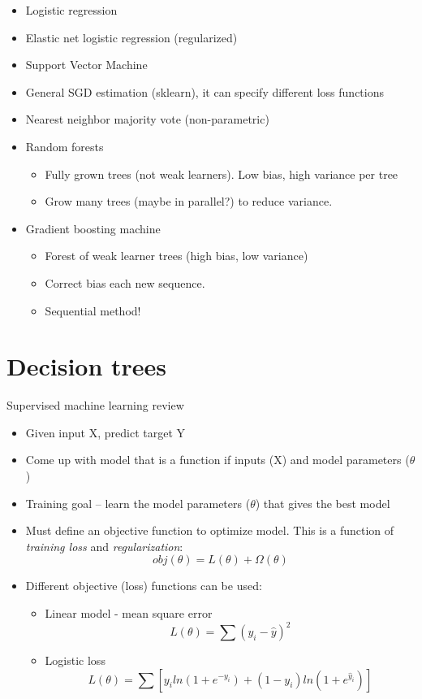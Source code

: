 \documentclass[fontset=fandol,zihao=false,scheme=chinese,heading=true,UTF8]{ctexbook}
\providecommand{\tightlist}{%
  \setlength{\itemsep}{0pt}\setlength{\parskip}{0pt}}
\begin{document}
\begin{itemize}
\tightlist
\item
  Logistic regression
\item
  Elastic net logistic regression (regularized)
\item
  Support Vector Machine
\item
  General SGD estimation (sklearn), it can specify different loss functions
\item
  Nearest neighbor majority vote (non-parametric)
\item
  Random forests

  \begin{itemize}
  \tightlist
  \item
    Fully grown trees (not weak learners). Low bias, high variance per tree
  \item
    Grow many trees (maybe in parallel?) to reduce variance.
  \end{itemize}
\item
  Gradient boosting machine

  \begin{itemize}
  \tightlist
  \item
    Forest of weak learner trees (high bias, low variance)
  \item
    Correct bias each new sequence.
  \item
    Sequential method!
  \end{itemize}
\end{itemize}

\hypertarget{decision-trees}{%
\chapter{Decision trees}\label{decision-trees}}

Supervised machine learning review

\begin{itemize}
\tightlist
\item
  Given input X, predict target Y
\item
  Come up with model that is a function if inputs (X) and model parameters (\(\theta\))
\item
  Training goal -- learn the model parameters (\(\theta\)) that gives the best model
\item
  Must define an objective function to optimize model. This is a function of \emph{training loss} and \emph{regularization}:
  \[obj(\theta) = L(\theta) + \Omega(\theta)\]
\item
  Different objective (loss) functions can be used:

  \begin{itemize}
  \tightlist
  \item
    Linear model - mean square error
    \[L(\theta) = \sum(y_i - \hat{y})^2\]
  \item
    Logistic loss
    \[L(\theta) = \sum [y_i ln(1 + e^{-y_i}) + (1-y_i)ln(1 + e^{\hat{y}_i})]\]
  \end{itemize}
\end{itemize}
\end{document}
